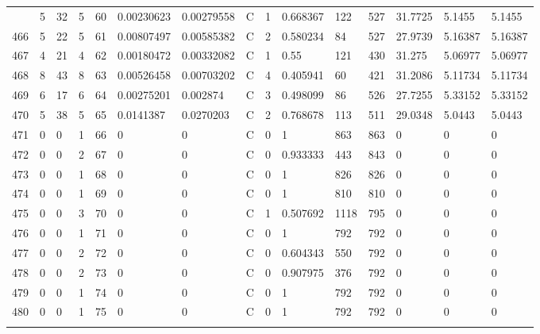 \begin{latin}
\begin{longtable}{lllllllllllllll}
\begin{comment}
	465 & 5  & 32  & 5  & 60  & 0.00230623     & 0.00279558     & C & 1  & 0.668367 & 122  & 527  & 31.7725 & 5.1455  & 5.1455  \\
	466 & 5  & 22  & 5  & 61  & 0.00807497     & 0.00585382     & C & 2  & 0.580234 & 84   & 527  & 27.9739 & 5.16387 & 5.16387 \\
	467 & 4  & 21  & 4  & 62  & 0.00180472     & 0.00332082     & C & 1  & 0.55     & 121  & 430  & 31.275  & 5.06977 & 5.06977 \\
	468 & 8  & 43  & 8  & 63  & 0.00526458     & 0.00703202     & C & 4  & 0.405941 & 60   & 421  & 31.2086 & 5.11734 & 5.11734 \\
	469 & 6  & 17  & 6  & 64  & 0.00275201     & 0.002874       & C & 3  & 0.498099 & 86   & 526  & 27.7255 & 5.33152 & 5.33152 \\
	470 & 5  & 38  & 5  & 65  & 0.0141387      & 0.0270203      & C & 2  & 0.768678 & 113  & 511  & 29.0348 & 5.0443  & 5.0443  \\
	471 & 0  & 0   & 1  & 66  & 0              & 0              & C & 0  & 1        & 863  & 863  & 0       & 0       & 0       \\
	472 & 0  & 0   & 2  & 67  & 0              & 0              & C & 0  & 0.933333 & 443  & 843  & 0       & 0       & 0       \\
	473 & 0  & 0   & 1  & 68  & 0              & 0              & C & 0  & 1        & 826  & 826  & 0       & 0       & 0       \\
	474 & 0  & 0   & 1  & 69  & 0              & 0              & C & 0  & 1        & 810  & 810  & 0       & 0       & 0       \\
	475 & 0  & 0   & 3  & 70  & 0              & 0              & C & 1  & 0.507692 & 1118 & 795  & 0       & 0       & 0       \\
	476 & 0  & 0   & 1  & 71  & 0              & 0              & C & 0  & 1        & 792  & 792  & 0       & 0       & 0       \\
	477 & 0  & 0   & 2  & 72  & 0              & 0              & C & 0  & 0.604343 & 550  & 792  & 0       & 0       & 0       \\
	478 & 0  & 0   & 2  & 73  & 0              & 0              & C & 0  & 0.907975 & 376  & 792  & 0       & 0       & 0       \\
	479 & 0  & 0   & 1  & 74  & 0              & 0              & C & 0  & 1        & 792  & 792  & 0       & 0       & 0       \\
	480 & 0  & 0   & 1  & 75  & 0              & 0              & C & 0  & 1        & 792  & 792  & 0       & 0       & 0       \\

\end{comment}
\end{longtable}
\end{latin}
